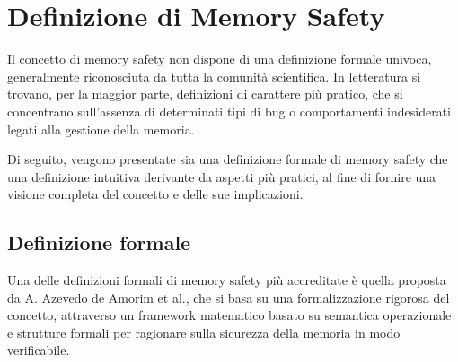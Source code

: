 \section{Definizione di Memory Safety}
\label{sec:memory_safety}

Il concetto di memory safety non dispone di una definizione formale univoca,
generalmente riconosciuta da tutta la comunità scientifica. In letteratura si trovano,
per la maggior parte, definizioni di carattere più pratico, che si concentrano
sull'assenza di determinati tipi di bug o comportamenti indesiderati legati alla
gestione della memoria.

Di seguito, vengono presentate sia una definizione formale di memory safety che una
definizione intuitiva derivante da aspetti più pratici, al fine di fornire una
visione completa del concetto e delle sue implicazioni.

\subsection{Definizione formale}
\label{sec:formal_definition}

Una delle definizioni formali di memory safety più accreditate è quella proposta
da A. Azevedo de Amorim et al.\cite{meaning_memory_safety}, che si basa su una formalizzazione
rigorosa del concetto, attraverso un framework matematico basato su semantica
operazionale e strutture formali per ragionare sulla sicurezza della memoria in
modo verificabile.

